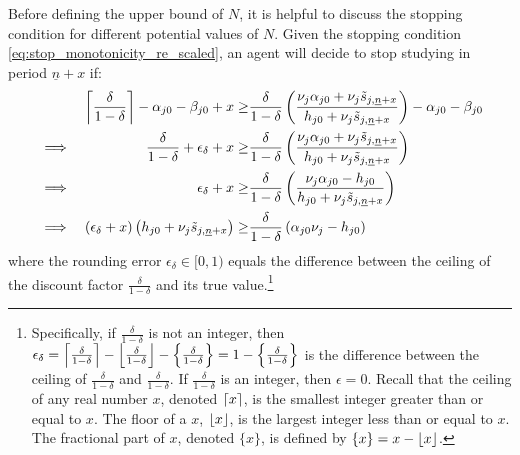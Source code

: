 \noindent
Before defining the upper bound of $N$, it is helpful to discuss the stopping condition for different potential values of $N$.
Given the stopping condition \eqref{eq:stop_monotonicity_re_scaled}, an agent will decide to stop studying in period $\underline{n} + x$ if: 
\begin{alignat}{3}
    &&
    \ddelta - \alpha_{j0} - \beta_{j0} + x
    \geq&
    \frac{\delta}{1-\delta}
    \pr{\frac{\nu_j \alpha_{j0} + \nu_j \ks[,\underline{n} + x]}{h_{j0} + \nu_j \ks[,\underline{n} + x]}}
    -\alpha_{j0} - \beta_{j0}
    \nonumber \\
    &\implies &
    \frac{\delta}{1 - \delta}
    + \epsilon_\delta
    + x
    \geq&
    \frac{\delta}{1 - \delta}
    \pr{
       \frac{\nu_j \alpha_{j0} + \nu_j \ks[,\underline{n} + x]}{h_{j0} + \nu_j \ks[,\underline{n} + x]}
    }
    \nonumber
    \\
    &\implies &
    \epsilon_\delta 
    + x
    \geq&
    \frac{\delta}{1 - \delta}
    \pr{
        \frac{\nu_j \alpha_{j0} - h_{j0}}{h_{j0} + \nu_j \ks[,\underline{n} + x]}
    }
    \nonumber
    \\
    &\implies &
    \pr{
        \epsilon_\delta  + x
    }
    \pr{h_{j0} + \nu_j \ks[,\underline{n} + x]}
    \geq&
    \frac{\delta}{1 - \delta}
    \pr{\alpha_{j0} \nu_j - h_{j0}}
    \label{eq:stop_with_error}
\end{alignat}
where the rounding error $\epsilon_\delta \in [0, 1)$ equals the difference between the ceiling of the discount factor $\frac{\delta}{1 - \delta}$ and its true value.\footnote{
    Specifically, if $\frac{\delta}{1 - \delta}$ is not an integer, then $\epsilon_\delta = \left\lceil \frac{\delta}{1 - \delta} \right\rceil - \left\lfloor \frac{\delta}{1 - \delta} \right\rfloor - \left\{ \frac{\delta}{1 - \delta} \right\} = 1 - \left\{ \frac{\delta}{1 - \delta} \right\}$ is the difference between the ceiling of $\frac{\delta}{1 - \delta}$ and $\frac{\delta}{1 - \delta}$. 
    If $\frac{\delta}{1 - \delta}$ is an integer, then $\epsilon = 0$.
    Recall that the ceiling of any real number $x$, denoted $\left\lceil x \right\rceil$, is the smallest integer greater than or equal to $x$.
    The floor of a $x$, $\left\lfloor x \right\rfloor$, is the largest integer less than or equal to $x$. 
    The fractional part of $x$, denoted $\{x\}$, is defined by $\{x\} = x - \left\lfloor x \right\rfloor$.
}


